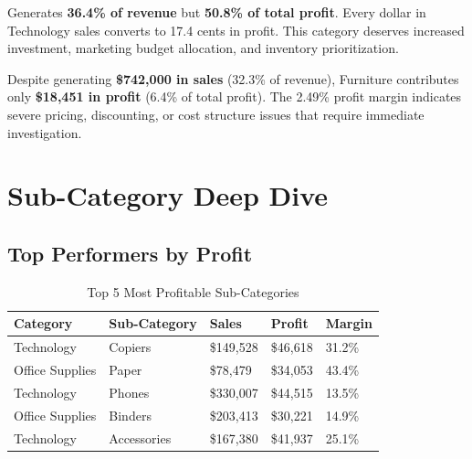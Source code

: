 \documentclass[11pt,a4paper]{article}
\begin{document}
\begin{tcolorbox}[
    colback=profitgreen!5,
    colframe=profitgreen!40,
    title=\textbf{Technology — The Star Performer},
    fonttitle=\bfseries,
    arc=6pt
]
Generates \textbf{36.4\% of revenue} but \textbf{50.8\% of total profit}. Every dollar in Technology sales converts to 17.4 cents in profit. This category deserves increased investment, marketing budget allocation, and inventory prioritization.
\end{tcolorbox}

\vspace{8pt}

\begin{tcolorbox}[
    colback=warningred!5,
    colframe=warningred!40,
    title=\textbf{Furniture — The Warning Signal},
    fonttitle=\bfseries,
    arc=6pt
]
Despite generating \textbf{\$742,000 in sales} (32.3\% of revenue), Furniture contributes only \textbf{\$18,451 in profit} (6.4\% of total profit). The 2.49\% profit margin indicates severe pricing, discounting, or cost structure issues that require immediate investigation.
\end{tcolorbox}

\section{Sub-Category Deep Dive}

\subsection{Top Performers by Profit}

\begin{table}[H]
\centering
\begin{tabular}{@{}p{3cm} p{3cm} p{2.5cm} p{2cm} p{2cm}@{}}
\toprule
\rowcolor{primary!10}
\textbf{Category} & \textbf{Sub-Category} & \textbf{Sales} & \textbf{Profit} & \textbf{Margin} \\
\midrule
Technology & Copiers & \$149,528 & \$46,618 & 31.2\% \\
Office Supplies & Paper & \$78,479 & \$34,053 & 43.4\% \\
Technology & Phones & \$330,007 & \$44,515 & 13.5\% \\
Office Supplies & Binders & \$203,413 & \$30,221 & 14.9\% \\
Technology & Accessories & \$167,380 & \$41,937 & 25.1\% \\
\bottomrule
\end{tabular}
\caption{Top 5 Most Profitable Sub-Categories}
\end{table}
\end{document}
